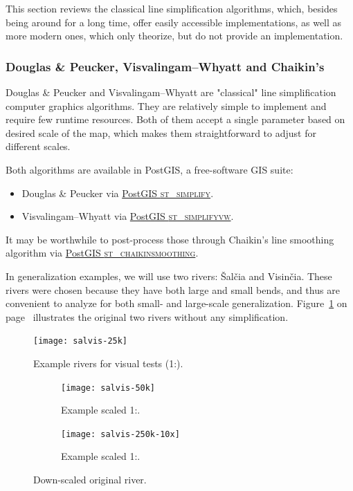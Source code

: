 \documentclass[a4paper]{article}
\newcommand{\onpage}[1]{\ref{#1} on page~\pageref{#1}}
\newcommand{\DP}{Douglas \& Peucker}
\newcommand{\VW}{Visvalingam--Whyatt}
\begin{document}
This section reviews the classical line simplification algorithms, which,
besides being around for a long time, offer easily accessible implementations,
as well as more modern ones, which only theorize, but do not provide an
implementation.

\subsubsection{{\DP}, {\VW} and Chaikin's}
\label{sec:dp-vwchaikin}

{\DP}\cite{douglas1973algorithms} and {\VW}\cite{visvalingam1993line} are
"classical" line simplification computer graphics algorithms. They are
relatively simple to implement and require few runtime resources. Both of them
accept a single parameter based on desired scale of the map, which makes them
straightforward to adjust for different scales.

Both algorithms are available in PostGIS, a free-software GIS suite:
\begin{itemize}
    \item {\DP} via
        \href{https://postgis.net/docs/ST_Simplify.html}{PostGIS \textsc{st\_simplify}}.

    \item {\VW} via
        \href{https://postgis.net/docs/ST_SimplifyVW.html}{PostGIS
        \textsc{st\_simplifyvw}}.
\end{itemize}

It may be worthwhile to post-process those through Chaikin's line smoothing
algorithm\cite{chaikin1974algorithm} via
\href{https://postgis.net/docs/ST_ChaikinSmoothing.html}{PostGIS
\textsc{st\_chaikinsmoothing}}.

In generalization examples, we will use two rivers: Šalčia and Visinčia.
These rivers were chosen because they have both large and small bends, and
thus are convenient to analyze for both small- and large-scale generalization.
Figure~\onpage{fig:salvis-25} illustrates the original two rivers without any
simplification.

\begin{figure}[ht]
    \centering
    \texttt{[image: salvis-25k]}
    \caption{Example rivers for visual tests (1:{}).}
    \label{fig:salvis-25}
\end{figure}

\begin{figure}[ht]
    \centering
    \begin{subfigure}[b]{.49\textwidth}
        \texttt{[image: salvis-50k]}
        \caption{Example scaled 1:.}
        \label{fig:salvis-50k}
    \end{subfigure}
    \hfill
    \begin{subfigure}[b]{.49\textwidth}
        \centering
        \texttt{[image: salvis-250k-10x]}
        \caption{Example scaled 1:.}
    \end{subfigure}
    \caption{Down-scaled original river.}
    \label{fig:salvis-50-250}
\end{figure}
\end{document}

